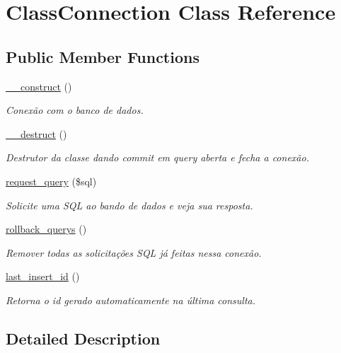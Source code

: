 \hypertarget{class_class_connection}{}\section{Class\+Connection Class Reference}
\label{class_class_connection}
\subsection*{Public Member Functions}
\begin{DoxyCompactItemize}
\item 
\hyperlink{class_class_connection_a095c5d389db211932136b53f25f39685}{\+\_\+\+\_\+construct} ()
\begin{DoxyCompactList}\small\item\em Conexão com o banco de dados. \end{DoxyCompactList}\item 
\hyperlink{class_class_connection_a421831a265621325e1fdd19aace0c758}{\+\_\+\+\_\+destruct} ()
\begin{DoxyCompactList}\small\item\em Destrutor da classe dando commit em query aberta e fecha a conexão. \end{DoxyCompactList}\item 
\hyperlink{class_class_connection_a45aa0f36cd2827c49d8341cd34b43aa0}{request\+\_\+query} (\$sql)
\begin{DoxyCompactList}\small\item\em Solicite uma S\+QL ao bando de dados e veja sua resposta. \end{DoxyCompactList}\item 
\hyperlink{class_class_connection_a278a7a9ce9d5327bf2af66959d9bc723}{rollback\+\_\+querys} ()
\begin{DoxyCompactList}\small\item\em Remover todas as solicitações S\+QL já feitas nessa conexão. \end{DoxyCompactList}\item 
\hyperlink{class_class_connection_addadc2022e9fe02f49da4f7672fb6819}{last\+\_\+insert\+\_\+id} ()
\begin{DoxyCompactList}\small\item\em Retorna o id gerado automaticamente na última consulta. \end{DoxyCompactList}\end{DoxyCompactItemize}


\subsection{Detailed Description}


